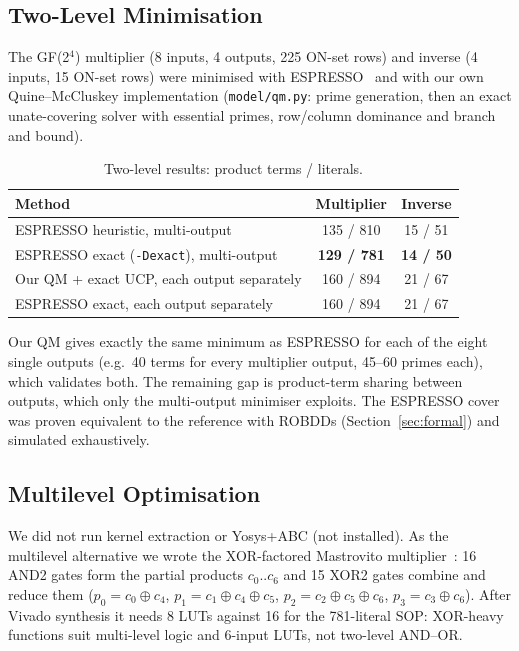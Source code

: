\documentclass[11pt,a4paper]{article}
\begin{document}
\subsection{Two-Level Minimisation}
The GF(2$^4$) multiplier (8 inputs, 4 outputs, 225 ON-set rows) and inverse (4 inputs, 15 ON-set rows)
were minimised with ESPRESSO~\cite{brayton84} and with our own Quine--McCluskey implementation
(\texttt{model/qm.py}: prime generation, then an exact unate-covering solver with essential primes,
row/column dominance and branch and bound).

\begin{table}[H]\centering\small
\caption{Two-level results: product terms / literals.}\label{tab:twolevel}
\begin{tabular}{@{}lcc@{}}
\toprule
Method & Multiplier & Inverse\\
\midrule
ESPRESSO heuristic, multi-output & 135 / 810 & 15 / 51\\
ESPRESSO exact (\texttt{-Dexact}), multi-output & \textbf{129 / 781} & \textbf{14 / 50}\\
Our QM + exact UCP, each output separately & 160 / 894 & 21 / 67\\
ESPRESSO exact, each output separately & 160 / 894 & 21 / 67\\
\bottomrule
\end{tabular}
\end{table}
Our QM gives exactly the same minimum as ESPRESSO for each of the eight single outputs (e.g.\ 40 terms
for every multiplier output, 45--60 primes each), which validates both. The remaining gap is product-term
sharing between outputs, which only the multi-output minimiser exploits. The ESPRESSO cover was proven
equivalent to the reference with ROBDDs (Section~\ref{sec:formal}) and simulated exhaustively.

\subsection{Multilevel Optimisation}
We did not run kernel extraction or Yosys+ABC (not installed). As the multilevel alternative we wrote
the XOR-factored Mastrovito multiplier~\cite{mastrovito88}: 16 AND2 gates form the partial products
$c_0..c_6$ and 15 XOR2 gates combine and reduce them ($p_0=c_0\oplus c_4$, $p_1=c_1\oplus c_4\oplus
c_5$, $p_2=c_2\oplus c_5\oplus c_6$, $p_3=c_3\oplus c_6$). After Vivado synthesis it needs 8 LUTs
against 16 for the 781-literal SOP: XOR-heavy functions suit multi-level logic and 6-input LUTs, not
two-level AND--OR.
\end{document}
